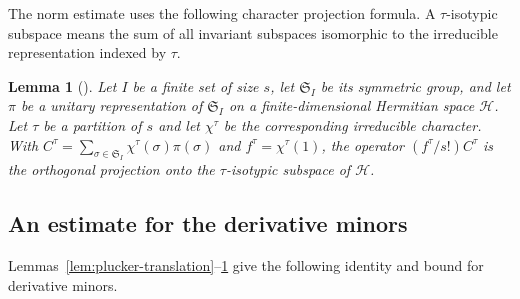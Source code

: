 \documentclass[11pt,letterpaper,reqno]{amsart}
\newtheorem{lem}[thm]{Lemma}
\theoremstyle{remark}
\numberwithin{equation}{section}
\begin{document}
The norm estimate uses the following character projection formula. A
$\tau$-isotypic subspace means the sum of all invariant subspaces isomorphic
to the irreducible representation indexed by $\tau$.

\begin{lem}[{\cite[Proposition~2.16]{KP26}}]\label{lem:character-projection}
Let $I$ be a finite set of size $s$, let $\mathfrak S_I$ be its symmetric
group, and let $\pi$ be a unitary representation of $\mathfrak S_I$ on a
finite-dimensional Hermitian space $\mathcal H$. Let $\tau$ be a partition
of $s$ and let $\chi^\tau$ be the corresponding irreducible character. With
$C^\tau=\sum_{\sigma\in\mathfrak S_I}\chi^\tau(\sigma)\pi(\sigma)$ and
$f^\tau=\chi^\tau(1)$, the operator $(f^\tau/s!)C^\tau$ is the orthogonal
projection onto the $\tau$-isotypic subspace of $\mathcal H$.
\end{lem}

\subsection{An estimate for the derivative minors}

Lemmas~\ref{lem:plucker-translation}--\ref{lem:character-projection}
give the following identity and bound for derivative minors.
\end{document}
